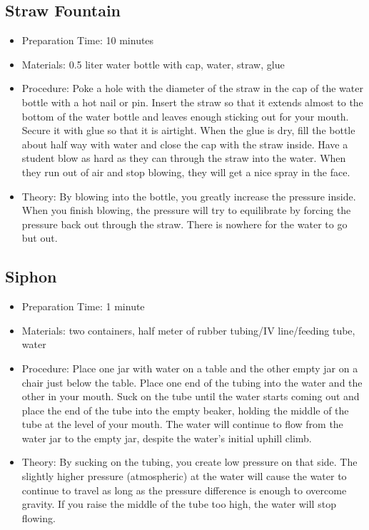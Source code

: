\subsection{Straw Fountain}
\begin{itemize}
\item{Preparation Time: 10 minutes}
\item{Materials: 0.5 liter water bottle with cap, water, straw, glue}
\item{Procedure: Poke a hole with the diameter of the straw in the cap of the water bottle with a hot nail or pin. Insert the straw so that it extends almost to the bottom of the water bottle and leaves enough sticking out for your mouth. Secure it with glue so that it is airtight. When the glue is dry, fill the bottle about half way with water and close the cap with the straw inside. Have a student blow as hard as they can through the straw into the water. When they run out of air and stop blowing, they will get a nice spray in the face. }
\item{Theory: By blowing into the bottle, you greatly increase the pressure inside. When you finish blowing, the pressure will try to equilibrate by forcing the pressure back out through the straw. There is nowhere for the water to go but out.}
\end{itemize}

\subsection{Siphon}
\begin{itemize}
\item{Preparation Time: 1 minute}
\item{Materials: two containers, half meter of rubber tubing/IV line/feeding tube, water}
\item{Procedure: Place one jar with water on a table and the other empty jar on a chair just below the table. Place one end of the tubing into the water and the other in your mouth. Suck on the tube until the water starts coming out and place the end of the tube into the empty beaker, holding the middle of the tube at the level of your mouth. The water will continue to flow from the water jar to the empty jar, despite the water’s initial uphill climb.}
\item{Theory: By sucking on the tubing, you create low pressure on that side. The slightly higher pressure (atmospheric) at the water will cause the water to continue to travel as long as the pressure difference is enough to overcome gravity. If you raise the middle of the tube too high, the water will stop flowing.}
\end{itemize}

